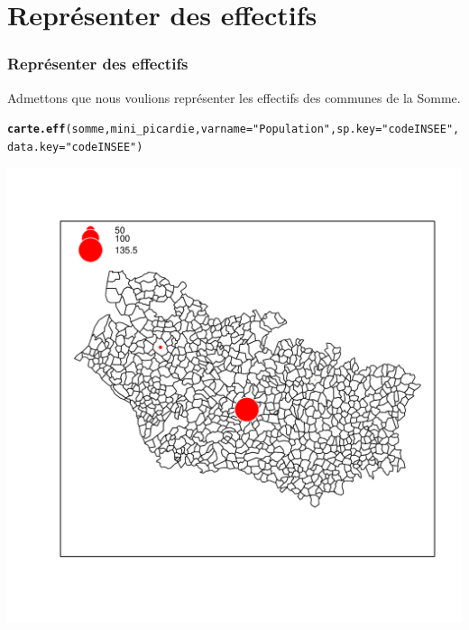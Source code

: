 \documentclass[slidetop, 10pt]{beamer}\usepackage{graphicx, color}
\makeatletter
\newcommand{\hlfunctioncall}[1]{\textcolor[rgb]{0.501960784313725,0,0.329411764705882}{\textbf{#1}}}%
\newcommand{\hlstring}[1]{\textcolor[rgb]{0.6,0.6,1}{#1}}%
\newenvironment{kframe}{%
 \def\at@end@of@kframe{}%
 \ifinner\ifhmode%
  \def\at@end@of@kframe{\end{minipage}}%
  \begin{minipage}{\columnwidth}%
 \fi\fi%
 \def\FrameCommand##1{\hskip\@totalleftmargin \hskip-\fboxsep
 \colorbox{shadecolor}{##1}\hskip-\fboxsep
     \hskip-\linewidth \hskip-\@totalleftmargin \hskip\columnwidth}%
 \MakeFramed {\advance\hsize-\width
   \@totalleftmargin\z@ \linewidth\hsize
   \@setminipage}}%
 {\par\unskip\endMakeFramed%
 \at@end@of@kframe}
\newenvironment{knitrout}{}{} %
\renewenvironment{knitrout}{\begin{tiny}}{\end{tiny}}
\makeatother
\begin{document}
\section{Représenter des effectifs}
\begin{frame}
\frametitle{Représenter des effectifs}

Admettons que nous voulions représenter les effectifs des communes de la Somme. 


\begin{knitrout}\tiny
{}\color{fgcolor}\begin{kframe}
\begin{alltt}
\hlfunctioncall{carte.eff}(somme, mini\_picardie, varname = \hlstring{"Population"}, sp.key = \hlstring{"codeINSEE"}, 
    data.key = \hlstring{"codeINSEE"})
\end{alltt}
\end{kframe}

{\centering \includegraphics[width=.55\linewidth]{images/carteeff} 

}


\end{knitrout}


\end{frame}
\end{document}
